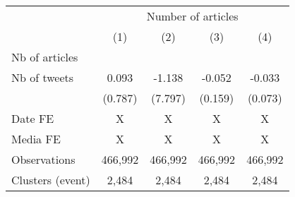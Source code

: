 {
\def\sym#1{\ifmmode^{#1}\else\(^{#1}\)\fi}
\begin{tabular}{l*{4}{c}}
\hline\hline
                    &\multicolumn{4}{c}{Number of articles}                                                 \\\cmidrule(lr){2-5}
                    &\multicolumn{1}{c}{(1)}         &\multicolumn{1}{c}{(2)}         &\multicolumn{1}{c}{(3)}         &\multicolumn{1}{c}{(4)}         \\
\hline
Nb of articles      &                     &                     &                     &                     \\
Nb of tweets        &       0.093         &      -1.138         &      -0.052         &      -0.033         \\
                    &     (0.787)         &     (7.797)         &     (0.159)         &     (0.073)         \\
\hline
Date FE             &           X         &           X         &           X         &           X         \\
Media FE            &           X         &           X         &           X         &           X         \\
Observations        &     466,992         &     466,992         &     466,992         &     466,992         \\
Clusters (event)    &       2,484         &       2,484         &       2,484         &       2,484         \\
\hline\hline
\end{tabular}
}
